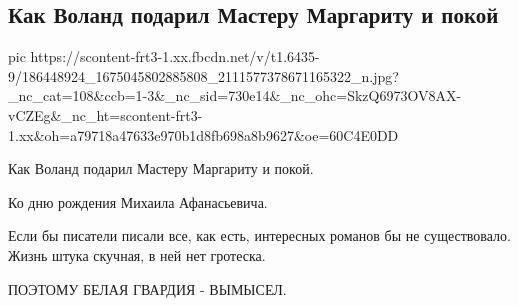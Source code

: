  
 
 
 
 

\subsection{Как Воланд подарил Мастеру Маргариту и покой}
\label{sec:15_05_2021.fb.ravreba_maximus.1.bulgakov_kiev}

\ifcmt
  pic https://scontent-frt3-1.xx.fbcdn.net/v/t1.6435-9/186448924_1675045802885808_2111577378671165322_n.jpg?_nc_cat=108&ccb=1-3&_nc_sid=730e14&_nc_ohc=SkzQ6973OV8AX-vCZEg&_nc_ht=scontent-frt3-1.xx&oh=a79718a47633e970b1d8fb698a8b9627&oe=60C4E0DD
\fi

Как Воланд подарил Мастеру Маргариту и покой.

Ко дню рождения Михаила Афанасьевича.

Если бы писатели писали все, как есть, интересных романов бы не существовало. Жизнь штука скучная, в ней нет гротеска. 

ПОЭТОМУ БЕЛАЯ ГВАРДИЯ - ВЫМЫСЕЛ.

